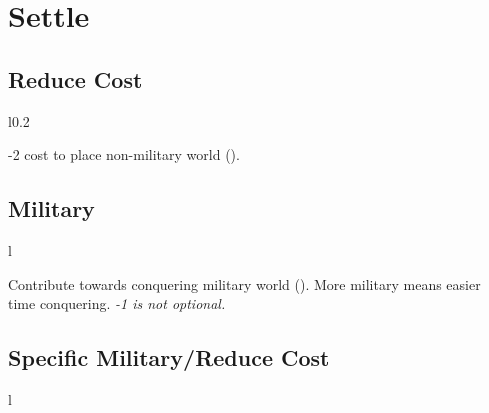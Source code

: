 \documentclass[letterpaper,landscape,twocolumn,8pt]{extarticle}
\newcommand{\inline}[1]{\scalerel*{#1}{M}}
\begin{document}

\section{Settle}%

\begin{minipage}[t]{0.31\columnwidth}
\RaggedRight{}
\subsection*{Reduce Cost}
\setlength{\intextsep}{0pt}%

\begin{wrapfigure}{l}{0.2\columnwidth}
    
\end{wrapfigure}

-2 cost to place non-military world
(\inline{}).
\subsection*{Military}
\begin{wrapfigure}{l}{\columnwidth}
    
    
\end{wrapfigure}

Contribute towards conquering military world
(\inline{}). More military means
easier time conquering.
\smallbreak{}
\textit{-1 is not optional.}
\subsection*{Specific Military/Reduce Cost}
\begin{wrapfigure}{l}{\columnwidth}
    
    
\end{wrapfigure}


\end{minipage}
\end{document}
